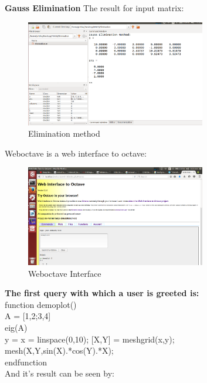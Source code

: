  \textbf{Gauss Elimination}
 The result for input matrix:\\
  \begin{figure}[!ht]
  	\centering
  	\includegraphics[width=0.7\textwidth]{images/Elimination.png}                
  	\caption{Elimination method }
  	\hspace{-1.5em}
  \end{figure}
  
  \newpage
  Weboctave is a web interface to octave:\\
  \begin{figure}[!ht]
  	\centering
  	\includegraphics[width=0.7\textwidth]{images/interface.png}                
  	\caption{Weboctave Interface}
  	\hspace{-1.5em}
  \end{figure}
  

\noindent \textbf { The first query with which a user is greeted is:}\\

\noindent function demoplot()\\
A = [1,2;3,4]\\
eig(A)\\
y = x = linspace(0,10);
[X,Y] = meshgrid(x,y);\\
mesh(X,Y,sin(X).*cos(Y).*X);\\
endfunction\\

And it's result can be seen by: 

